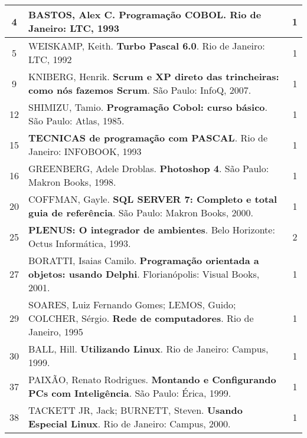 \begin{longtable}{|c|p{115mm}|c|}
4      & BASTOS, Alex C. \textbf{Programação COBOL}. Rio de Janeiro: LTC, 1993                 		 & 1          \\ \hline
5      & WEISKAMP, Keith. \textbf{Turbo Pascal 6.0}. Rio de Janeiro: LTC, 1992                 		 & 1          \\ \hline
9      & KNIBERG, Henrik. \textbf{Scrum e XP direto das trincheiras: como nós fazemos Scrum}. São Paulo: InfoQ, 2007. & 1          \\ \hline
12     & SHIMIZU, Tamio. \textbf{Programação Cobol: curso básico}. São Paulo: Atlas, 1985.     & 1          \\ \hline15     & \textbf{TECNICAS de programação com PASCAL}. Rio de Janeiro: INFOBOOK, 1993            & 1          \\ \hline
16     & GREENBERG, Adele Droblas. \textbf{Photoshop 4}. São Paulo: Makron Books, 1998.        & 1          \\ \hline
20     & COFFMAN, Gayle. \textbf{SQL SERVER 7: Completo e total guia de referência}. São Paulo: Makron Books, 2000. & 1          \\ \hline
25     & \textbf{PLENUS: O integrador de ambientes}. Belo Horizonte: Octus Informática, 1993.  & 2          \\ \hline
27     & BORATTI, Isaias Camilo. \textbf{Programação orientada a objetos: usando Delphi}. Florianópolis: Visual Books, 2001. & 1          \\ \hline
29     & SOARES, Luiz Fernando Gomes; LEMOS, Guido; COLCHER, Sérgio. \textbf{Rede de computadores}. Rio de Janeiro, 1995 & 1 \\ \hline
30     & BALL, Hill. \textbf{Utilizando Linux}. Rio de Janeiro: Campus, 1999.                  & 1          \\ \hline
37     & PAIXÃO, Renato Rodrigues. \textbf{Montando e Configurando PCs com Inteligência}. São Paulo: Érica,  1999. & 1          \\ \hline
38     & TACKETT JR, Jack; BURNETT, Steven. \textbf{Usando Especial Linux}. Rio de Janeiro: Campus, 2000. & 1          \\ \hline


\end{longtable}

